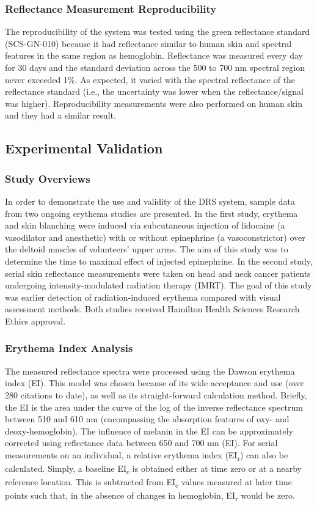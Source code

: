 \subsubsection{Reflectance Measurement Reproducibility}
The reproducibility of the system was tested using the green reflectance standard (SCS-GN-010) because it had reflectance similar to human skin and spectral features in the same region as hemoglobin. Reflectance was measured every day for 30 days and the standard deviation across the 500 to 700 nm spectral region never exceeded 1\%. As expected, it varied with the spectral reflectance of the reflectance standard (i.e., the uncertainty was lower when the reflectance/signal was higher). Reproducibility measurements were also performed on human skin and they had a similar result.

\subsection{Experimental Validation}

\subsubsection{Study Overviews}
In order to demonstrate the use and validity of the DRS system, sample data from two ongoing erythema studies are presented. In the first study, erythema and skin blanching were induced via subcutaneous injection of lidocaine (a vasodilator and anesthetic) with or without epinephrine (a vasoconstrictor) over the deltoid muscles of volunteers’ upper arms. The aim of this study was to determine the time to maximal effect of injected epinephrine. In the second study, serial skin reflectance measurements were taken on head and neck cancer patients undergoing intensity-modulated radiation therapy (IMRT). The goal of this study was earlier detection of radiation-induced erythema compared with visual assessment methods. Both studies received Hamilton Health Sciences Research Ethics approval.

\subsubsection{Erythema Index Analysis}
\label{sec:ei_analysis}
The measured reflectance spectra were processed using the Dawson erythema index (EI).\cite{Dawson1980} This model was chosen because of its wide acceptance and use (over 280 citations to date),\cite{Riordan2001} as well as its straight-forward calculation method. Briefly, the EI is the area under the curve of the log of the inverse reflectance spectrum between 510 and 610 nm (encompassing the absorption features of oxy- and deoxy-hemoglobin). The influence of melanin in the EI can be approximately corrected using reflectance data between 650 and 700 nm (EI). For serial measurements on an individual, a relative erythema index (EI\textsubscript{r}) can also be calculated. Simply, a baseline EI\textsubscript{c} is obtained either at time zero or at a nearby reference location. This is subtracted from EI\textsubscript{c} values measured at later time points such that, in the absence of changes in hemoglobin, EI\textsubscript{r} would be zero.

